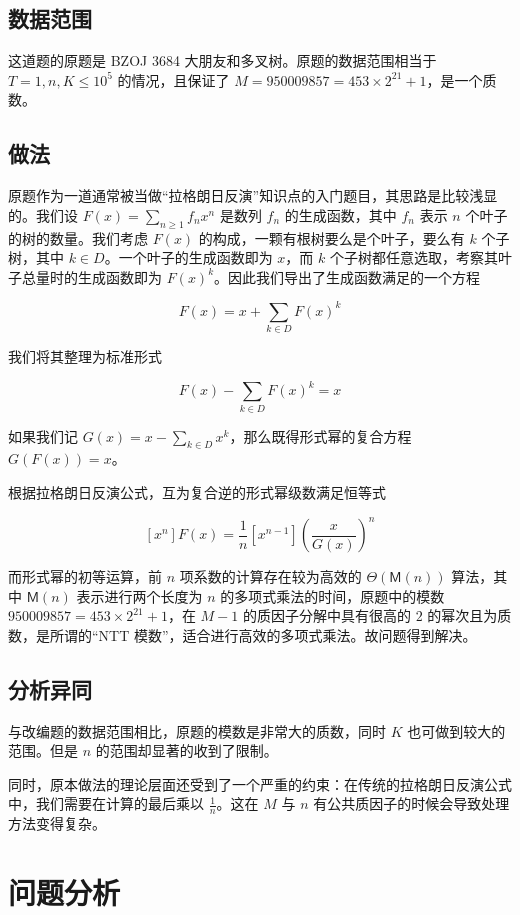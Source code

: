 \documentclass[12pt]{ctexart}
\newcommand{\Mul}{\ensuremath{\mathsf M}}
\begin{document}
\subsection{数据范围}

这道题的原题是 BZOJ 3684 大朋友和多叉树。原题的数据范围相当于 $T = 1, n, K \le 10^5$ 的情况，且保证了 $M=950009857 = 453\times2^{21}+1$，是一个质数。

\subsection{做法}

原题作为一道通常被当做“拉格朗日反演”知识点的入门题目，其思路是比较浅显的。我们设 $F(x) = \sum_{n\ge 1} f_n x^n$ 是数列 $f_n$ 的生成函数，其中 $f_n$ 表示 $n$ 个叶子的树的数量。我们考虑 $F(x)$ 的构成，一颗有根树要么是个叶子，要么有 $k$ 个子树，其中 $k\in D$。一个叶子的生成函数即为 $x$，而 $k$ 个子树都任意选取，考察其叶子总量时的生成函数即为 $F(x)^k$。因此我们导出了生成函数满足的一个方程

$$
F(x)=x+\sum_{k\in D} F(x)^k
$$

我们将其整理为标准形式

$$
F(x) - \sum_{k\in D} F(x)^k=x
$$

如果我们记 $G(x) = x - \sum_{k\in D}x^k$，那么既得形式幂的复合方程 $G(F(x))=x$。

根据拉格朗日反演公式，互为复合逆的形式幂级数满足恒等式

$$
[x^n] F(x) = \frac 1n[x^{n-1}] \left(\frac{x}{G(x)}\right)^n
$$

而形式幂的初等运算，前 $n$ 项系数的计算存在较为高效的 $\Theta(\Mul(n))$ 算法，其中 $\Mul(n)$ 表示进行两个长度为 $n$ 的多项式乘法的时间，原题中的模数 $950009857 = 453\times2^{21}+1$，在 $M-1$ 的质因子分解中具有很高的 $2$ 的幂次且为质数，是所谓的“NTT 模数”，适合进行高效的多项式乘法。故问题得到解决。

\subsection{分析异同}

与改编题的数据范围相比，原题的模数是非常大的质数，同时 $K$ 也可做到较大的范围。但是 $n$ 的范围却显著的收到了限制。

同时，原本做法的理论层面还受到了一个严重的约束：在传统的拉格朗日反演公式中，我们需要在计算的最后乘以 $\frac 1n$。这在 $M$ 与 $n$ 有公共质因子的时候会导致处理方法变得复杂。

\section{问题分析}
\end{document}
